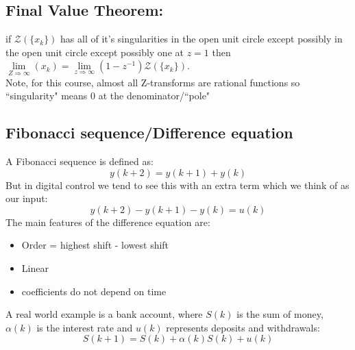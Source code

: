 \documentclass[a4paper,11pt]{article}
\begin{document}
	\subsection {Final Value Theorem:}
		if $\mathcal{Z}(\{x_k\})$ has all of it's singularities in the open unit circle except possibly in the open unit circle except possibly one at $z=1$ then $\lim\limits_{Z\Rightarrow\infty}(x_k)=\lim\limits_{z\Rightarrow\infty}(1-z^{-1})\mathcal{Z}(\{x_k\})$.\\
		Note, for this course, almost all Z-transforms are rational functions so ``singularity" means 0 at the denominator/``pole"
	\subsection{Fibonacci sequence/Difference equation}
		A Fibonacci sequence is defined as:
		\begin{equation}
		    y(k+2)=y(k+1)+y(k)
		\end{equation}
		But in digital control we tend to see this with an extra term which we think of as our input:
		\begin{equation}
		    y(k+2)-y(k+1)-y(k) = u(k)
		\end{equation}
		The main features of the difference equation are:
		\begin{itemize}
		    \item Order = highest shift - lowest shift
		    \item Linear
		    \item coefficients do not depend on time 
		\end{itemize}
		A real world example is a bank account, where $S(k)$ is the sum of money, $\alpha(k)$ is the interest rate and $u(k)$ represents deposits and withdrawals:
		\begin{equation} 
			S(k+1)= S(k) +\alpha(k)S(k) +u(k)
		\end{equation}
\end{document}
